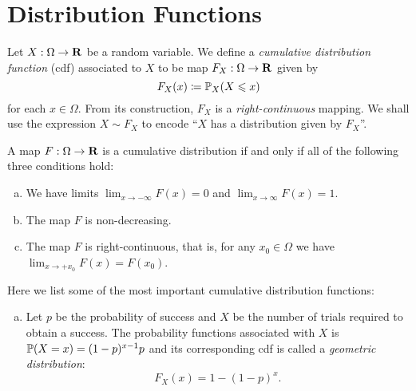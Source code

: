 \section{Distribution Functions}

\begin{definition}
\label{def:cumulative-distribution-function}
Let \(X: \Omega \to \mathbf{R}\) be a random variable. We define a \emph{cumulative distribution
  function} (cdf) associated to \(X\) to be map \(F_X: \Omega \to \mathbf{R}\) given by
\[
F_X(x) \coloneq \operatorname{\mathbb{P}}_X(X \leqslant x)
\]
for each \(x \in \Omega\). From its construction, \(F_X\) is a
\emph{right-continuous} mapping. We shall use the expression \(X \sim F_X\) to
encode ``\(X\) has a distribution given by \(F_X\)''.
\end{definition}

\begin{theorem}
\label{thm:cdf-iff-properties}
A map \(F: \Omega \to \mathbf{R}\) is a cumulative distribution if and only if all of
the following three conditions hold:
\begin{enumerate}[(a)]\setlength\itemsep{0em}
\item We have limits \(\lim_{x \to -\infty} F(x) = 0\) and \(\lim_{x \to \infty} F(x) = 1\).
\item The map \(F\) is non-decreasing.
\item The map \(F\) is right-continuous, that is, for any \(x_0 \in \Omega\) we
  have \(\lim_{x \to +x_0} F(x) = F(x_0)\).
\end{enumerate}
\end{theorem}

\begin{example}
\label{exp:cdfs}
Here we list some of the most important cumulative distribution functions:
\begin{enumerate}[(a)]\setlength\itemsep{0em}
\item Let \(p\) be the probability of success and \(X\) be the number of trials
  required to obtain a success. The probability functions associated with \(X\)
  is \(\operatorname{\mathbb{P}}(X = x) = (1 - p)^{x-1} p\) and its corresponding cdf is called a
  \emph{geometric distribution}:
  \[
  F_X(x) = 1 - (1 - p)^x.
  \]

\end{enumerate}
\end{example}

